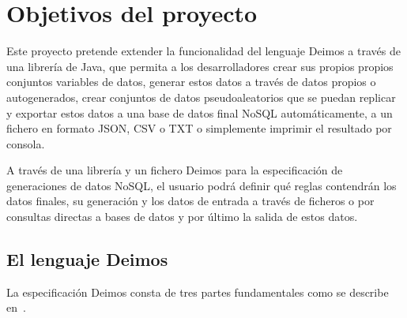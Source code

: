 \chapter{Objetivos del proyecto\label{03analisisObjetivos}}

Este proyecto pretende extender la funcionalidad del lenguaje Deimos a través de una librería de Java, que permita a los desarrolladores crear sus propios propios conjuntos variables de datos, generar estos datos a través de datos propios o autogenerados, crear conjuntos de datos pseudoaleatorios que se puedan replicar y exportar estos datos a una base de datos final NoSQL automáticamente, a un fichero en formato JSON, CSV o TXT o simplemente imprimir el resultado por consola.

A través de una librería y un fichero Deimos para la especificación de generaciones de datos NoSQL, el usuario podrá definir qué reglas contendrán los datos finales, su generación y los datos de entrada a través de ficheros o por consultas directas a bases de datos y por último la salida de estos datos.

\section{El lenguaje Deimos}

La especificación Deimos consta de tres partes fundamentales como se describe en~\cite{deimosAlberto}.

